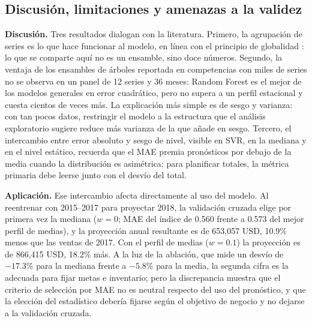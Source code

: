 \documentclass[pdflatex,sn-mathphys-num]{sn-jnl}
\begin{document}
\subsection{Discusión, limitaciones y amenazas a la validez}\label{subsec:discusion}

\textbf{Discusión.} Tres resultados dialogan con la literatura. Primero, la agrupación de series es lo que hace funcionar al modelo, en línea con el principio de globalidad \cite{monteromanso2021}: lo que se comparte aquí no es un ensamble, sino doce números. Segundo, la ventaja de los ensambles de árboles reportada en competencias con miles de series \cite{makridakis2022} no se observa en un panel de 12 series y 36 meses: Random Forest es el mejor de los modelos generales en error cuadrático, pero no supera a un perfil estacional y cuesta cientos de veces más. La explicación más simple es de sesgo y varianza: con tan pocos datos, restringir el modelo a la estructura que el análisis exploratorio sugiere reduce más varianza de la que añade en sesgo. Tercero, el intercambio entre error absoluto y sesgo de nivel, visible en SVR, en la mediana y en el nivel estático, recuerda que el MAE premia pronósticos por debajo de la media cuando la distribución es asimétrica; para planificar totales, la métrica primaria debe leerse junto con el desvío del total.

\textbf{Aplicación.} Ese intercambio afecta directamente al uso del modelo. Al reentrenar con 2015--2017 para proyectar 2018, la validación cruzada elige por primera vez la mediana ($w=0$; MAE del índice de 0.560 frente a 0.573 del mejor perfil de medias), y la proyección anual resultante es de 653{,}057 USD, 10.9\% menos que las ventas de 2017. Con el perfil de medias ($w=0.1$) la proyección es de 866{,}415 USD, 18.2\% más. A la luz de la ablación, que mide un desvío de $-17.3$\% para la mediana frente a $-5.8$\% para la media, la segunda cifra es la adecuada para fijar metas e inventario; pero la discrepancia muestra que el criterio de selección por MAE no es neutral respecto del uso del pronóstico, y que la elección del estadístico debería fijarse según el objetivo de negocio y no dejarse a la validación cruzada.
\end{document}
